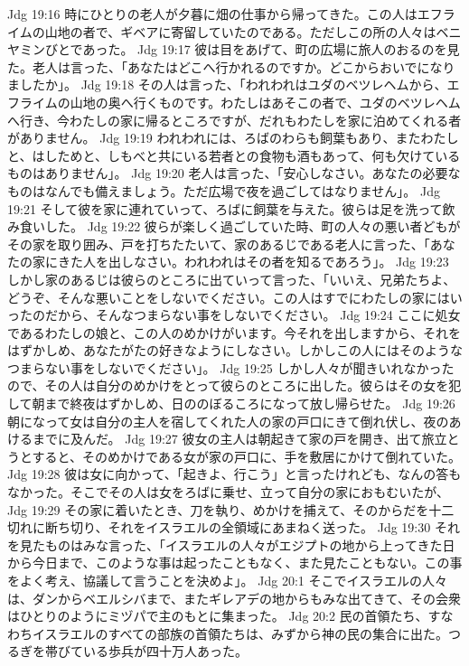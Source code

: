 Jdg 19:16  時にひとりの老人が夕暮に畑の仕事から帰ってきた。この人はエフライムの山地の者で、ギベアに寄留していたのである。ただしこの所の人々はベニヤミンびとであった。
Jdg 19:17  彼は目をあげて、町の広場に旅人のおるのを見た。老人は言った、「あなたはどこへ行かれるのですか。どこからおいでになりましたか」。
Jdg 19:18  その人は言った、「われわれはユダのベツレヘムから、エフライムの山地の奥へ行くものです。わたしはあそこの者で、ユダのベツレヘムへ行き、今わたしの家に帰るところですが、だれもわたしを家に泊めてくれる者がありません。
Jdg 19:19  われわれには、ろばのわらも飼葉もあり、またわたしと、はしためと、しもべと共にいる若者との食物も酒もあって、何も欠けているものはありません」。
Jdg 19:20  老人は言った、「安心しなさい。あなたの必要なものはなんでも備えましょう。ただ広場で夜を過ごしてはなりません」。
Jdg 19:21  そして彼を家に連れていって、ろばに飼葉を与えた。彼らは足を洗って飲み食いした。
Jdg 19:22  彼らが楽しく過ごしていた時、町の人々の悪い者どもがその家を取り囲み、戸を打ちたたいて、家のあるじである老人に言った、「あなたの家にきた人を出しなさい。われわれはその者を知るであろう」。
Jdg 19:23  しかし家のあるじは彼らのところに出ていって言った、「いいえ、兄弟たちよ、どうぞ、そんな悪いことをしないでください。この人はすでにわたしの家にはいったのだから、そんなつまらない事をしないでください。
Jdg 19:24  ここに処女であるわたしの娘と、この人のめかけがいます。今それを出しますから、それをはずかしめ、あなたがたの好きなようにしなさい。しかしこの人にはそのようなつまらない事をしないでください」。
Jdg 19:25  しかし人々が聞きいれなかったので、その人は自分のめかけをとって彼らのところに出した。彼らはその女を犯して朝まで終夜はずかしめ、日ののぼるころになって放し帰らせた。
Jdg 19:26  朝になって女は自分の主人を宿してくれた人の家の戸口にきて倒れ伏し、夜のあけるまでに及んだ。
Jdg 19:27  彼女の主人は朝起きて家の戸を開き、出て旅立とうとすると、そのめかけである女が家の戸口に、手を敷居にかけて倒れていた。
Jdg 19:28  彼は女に向かって、「起きよ、行こう」と言ったけれども、なんの答もなかった。そこでその人は女をろばに乗せ、立って自分の家におもむいたが、
Jdg 19:29  その家に着いたとき、刀を執り、めかけを捕えて、そのからだを十二切れに断ち切り、それをイスラエルの全領域にあまねく送った。
Jdg 19:30  それを見たものはみな言った、「イスラエルの人々がエジプトの地から上ってきた日から今日まで、このような事は起ったこともなく、また見たこともない。この事をよく考え、協議して言うことを決めよ」。
Jdg 20:1  そこでイスラエルの人々は、ダンからベエルシバまで、またギレアデの地からもみな出てきて、その会衆はひとりのようにミヅパで主のもとに集まった。
Jdg 20:2  民の首領たち、すなわちイスラエルのすべての部族の首領たちは、みずから神の民の集合に出た。つるぎを帯びている歩兵が四十万人あった。
